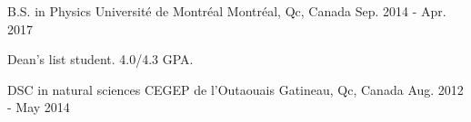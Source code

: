\begin{cventries}
  \cventry
    {B.S. in Physics}
    {Universit\'e de Montr\'eal}
    {Montr\'eal, Qc, Canada}
    {Sep. 2014 - Apr. 2017}
    {
      \begin{cvitems}
        \item {Dean's list student. 4.0/4.3 GPA.}
      \end{cvitems}
    }
  \cventry
    {DSC in natural sciences}
    {CEGEP de l'Outaouais}
    {Gatineau, Qc, Canada}
    {Aug. 2012 - May 2014}
    {}
\end{cventries}
